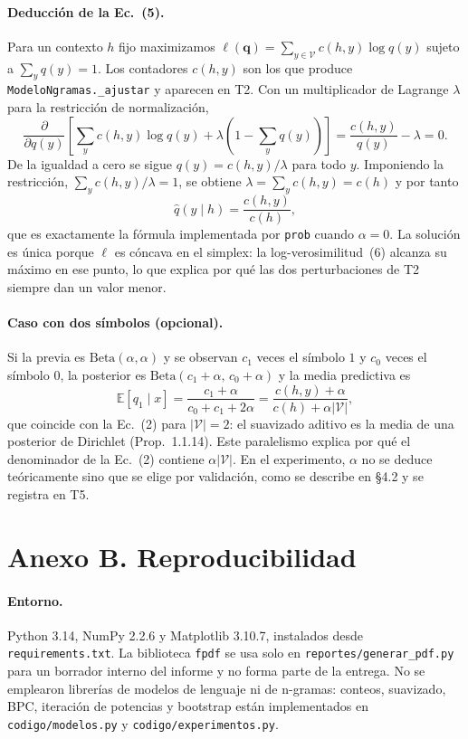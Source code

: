 \documentclass[11pt,letterpaper]{article}
\begin{document}
	\paragraph{Deducción de la Ec.~(5).}
	Para un contexto $h$ fijo maximizamos $\ell(\mathbf{q}) = \sum_{y \in \mathcal{V}} c(h,y) \log q(y)$ sujeto a $\sum_y q(y) = 1$. Los contadores $c(h,y)$ son los que produce \texttt{ModeloNgramas.\_ajustar} y aparecen en T2. Con un multiplicador de Lagrange $\lambda$ para la restricción de normalización,
	\[
	\frac{\partial}{\partial q(y)}
	\left[\sum_y c(h,y) \log q(y) + \lambda \left(1 - \sum_y q(y)\right)\right]
	= \frac{c(h,y)}{q(y)} - \lambda = 0.
	\]
	De la igualdad a cero se sigue $q(y) = c(h,y) / \lambda$ para todo $y$. Imponiendo la restricción, $\sum_y c(h,y) / \lambda = 1$, se obtiene $\lambda = \sum_y c(h,y) = c(h)$ y por tanto
	\[
	\hat q(y \mid h) = \frac{c(h,y)}{c(h)},
	\]
	que es exactamente la fórmula implementada por \texttt{prob} cuando $\alpha = 0$. La solución es única porque $\ell$ es cóncava en el simplex: la log-verosimilitud~(6) alcanza su máximo en ese punto, lo que explica por qué las dos perturbaciones de T2 siempre dan un valor menor.
	
	\paragraph{Caso con dos símbolos (opcional).}
	Si la previa es $\mathrm{Beta}(\alpha,\alpha)$ y se observan $c_1$ veces el símbolo $1$ y $c_0$ veces el símbolo $0$, la posterior es $\mathrm{Beta}(c_1 + \alpha,\, c_0 + \alpha)$ y la media predictiva es
	\[
	\mathbb{E}[q_1 \mid x] = \frac{c_1 + \alpha}{c_0 + c_1 + 2\alpha}
	= \frac{c(h,y) + \alpha}{c(h) + \alpha |\mathcal{V}|},
	\]
	que coincide con la Ec.~(2) para $|\mathcal{V}| = 2$: el suavizado aditivo es la media de una posterior de Dirichlet (Prop.~1.1.14). Este paralelismo explica por qué el denominador de la Ec.~(2) contiene $\alpha |\mathcal{V}|$. En el experimento, $\alpha$ no se deduce teóricamente sino que se elige por validación, como se describe en \S 4.2 y se registra en T5.
	
	\section*{Anexo B. Reproducibilidad}
	
	\paragraph{Entorno.}
	Python 3.14, NumPy 2.2.6 y Matplotlib 3.10.7, instalados desde \texttt{requirements.txt}. La biblioteca \texttt{fpdf} se usa solo en \texttt{reportes/generar\_pdf.py} para un borrador interno del informe y no forma parte de la entrega. No se emplearon librerías de modelos de lenguaje ni de n-gramas: conteos, suavizado, BPC, iteración de potencias y bootstrap están implementados en \texttt{codigo/modelos.py} y \texttt{codigo/experimentos.py}.
	
\end{document}
